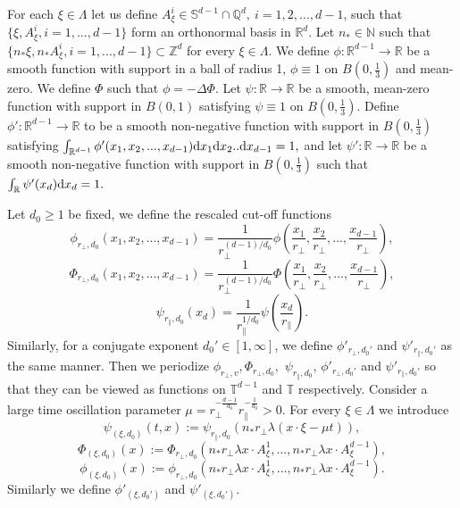 \documentclass[UTF-8,reqno]{amsart}
\numberwithin{equation}{section}
\theoremstyle{definition}
\def\dif{{\mathord{{\rm d}}}}
\def\mN{{\mathbb N}}
\def\geq{\geqslant}
\def\dif{{\mathord{{\rm d}}}}
\def\geq{\geqslant}
\begin{document}
For each $\xi\in\Lambda$ let us define $A^i_\xi\in \mathbb{S}^{d-1}\cap \mathbb{Q}^d,\ i=1,2,...,d-1$, such that $\{\xi, A^i_\xi,i=1,...,d-1\}$
form an orthonormal basis in $\mathbb{R}^d$. 
 Let  $n_*\in\mN$ such that$\{n_*\xi, n_*A^i_\xi,i=1,...,d-1\}\subset\mathbb{Z}^d$
for every $\xi\in\Lambda$. 
We define $\phi : \mathbb{R}^{d-1} \to \mathbb{R}$ be a smooth function with support in a ball of radius 1, $\phi\equiv 1$ on $B(0,\frac13)$ and mean-zero. We define $\Phi$ such that $\phi = -\Delta\Phi$. %
Let $\psi : \mathbb{R}\to\mathbb{R}$  be a smooth, mean-zero  function with
support in $B(0,1)$ satisfying $\psi\equiv 1$ on $B(0,\frac13)$. 
Define $\phi' : \mathbb{R}^{d-1} \to \mathbb{R}$ to be a smooth non-negative   function with support in $B(0,\frac13)$ satisfying $\int_{\mathbb{R}^{d-1}}\phi'(x_1,x_2,...,x_{d-1})\dif x_1\dif x_2..\dif x_{d-1}=1,$
and let $\psi' : \mathbb{R} \to \mathbb{R}$ be a smooth non-negative   function with support in $B(0,\frac13)$ such that
$\int_\mathbb{R}\psi'(x_d)\dif x_d=1.$

Let  $d_0\geq1$ be fixed, we define the rescaled cut-off functions
$$\phi _{r_{\perp},{d_0}}(x_1,x_2,...,x_{d-1})=\frac1{r_{\perp}^{(d-1)/{d_0}}}\phi (\frac{x_1}{r_{\perp}},\frac{x_2}{r_{\perp}},...,\frac{x_{d-1}}{r_{\perp}}),$$
$$\Phi _{r_{\perp},{d_0}}(x_1,x_2,...,x_{d-1})=\frac1{r_{\perp}^{(d-1)/{d_0}}}\Phi (\frac{x_1}{r_{\perp}},\frac{x_2}{r_{\perp}},...,\frac{x_{d-1}}{r_{\perp}}),$$
$$\psi _{r_{\parallel},{d_0}}(x_d)=\frac1{r_{\parallel}^{1/{d_0}}}\psi (\frac{x_d}{r_{\parallel}}).$$
Similarly,  for a conjugate exponent $d_0'\in[1,\infty]$, we define $\phi '_{r_{\perp},d_0'}$ and $\psi'_{r_{\parallel},d_0'}$ as the same manner. Then we periodize $\phi _{r_{\perp},v},\Phi _{r_{\perp},{d_0}},$ $\psi _{r_{\parallel},{d_0}}$, $\phi '_{r_{\perp},d_0'}$ and $\psi'_{r_{\parallel},{d_0}'}$ so that they can be viewed as functions on $\mathbb{T}^{d-1}$ and $\mathbb{T}$ respectively.
Consider a large time oscillation parameter $  \mu=r_\perp^{-\frac{d-1}{d_0}}r_\parallel^{-\frac1{d_0}}> 0$. For every $\xi\in\Lambda$ we introduce
$$\psi _{(\xi,d_0)}(t,x):=
\psi _{r_{\parallel},d_0}(n_*r_{\perp}\lambda(x\cdot \xi-\mu t)),$$
$$\Phi _{(\xi,d_0)}(x):=
\Phi _{r_{\perp},d_0}(n_*r_{\perp}\lambda x\cdot A^1_{\xi},...,n_*r_{\perp}\lambda x\cdot A^{d-1}_{\xi}),$$
$$\phi _{(\xi,d_0)}(x):=
\phi _{r_{\perp},d_0}(n_*r_{\perp}\lambda x\cdot A^1_{\xi},...,n_*r_{\perp}\lambda x\cdot A^{d-1}_{\xi}).$$
Similarly  we define  $\phi '_{(\xi,d_0')}$  and $\psi'_{(\xi,d_0')}$. 
\end{document}
